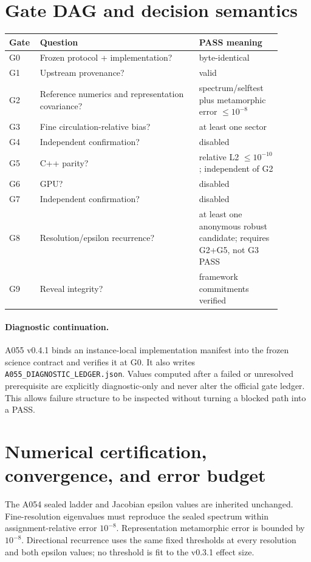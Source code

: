\documentclass[11pt,a4paper]{article}
\newcommand{\code}[1]{\texttt{#1}}
\begin{document}
\section{Gate DAG and decision semantics}
\begin{longtable}{L{0.07\linewidth}L{0.54\linewidth}L{0.28\linewidth}}\toprule Gate&Question&PASS meaning\\\midrule
G0&Frozen protocol + implementation?&byte-identical\\
G1&Upstream provenance?&valid\\
G2&Reference numerics and representation covariance?&spectrum/selftest plus metamorphic error $\le10^{-8}$\\
G3&Fine circulation-relative bias?&at least one sector\\
G4&Independent confirmation?&disabled\\
G5&C++ parity?&relative L2 $\le10^{-10}$; independent of G2\\
G6&GPU?&disabled\\
G7&Independent confirmation?&disabled\\
G8&Resolution/epsilon recurrence?&at least one anonymous robust candidate; requires G2+G5, not G3 PASS\\
G9&Reveal integrity?&framework commitments verified\\\bottomrule\end{longtable}
\paragraph{Diagnostic continuation.} A055 v0.4.1 binds an instance-local implementation manifest into the frozen science contract and verifies it at G0. It also writes \code{A055\_DIAGNOSTIC\_LEDGER.json}. Values computed after a failed or unresolved prerequisite are explicitly diagnostic-only and never alter the official gate ledger. This allows failure structure to be inspected without turning a blocked path into a PASS.
\section{Numerical certification, convergence, and error budget}
The A054 sealed ladder and Jacobian epsilon values are inherited unchanged. Fine-resolution eigenvalues must reproduce the sealed spectrum within assignment-relative error $10^{-8}$. Representation metamorphic error is bounded by $10^{-8}$. Directional recurrence uses the same fixed thresholds at every resolution and both epsilon values; no threshold is fit to the v0.3.1 effect size.
\end{document}
